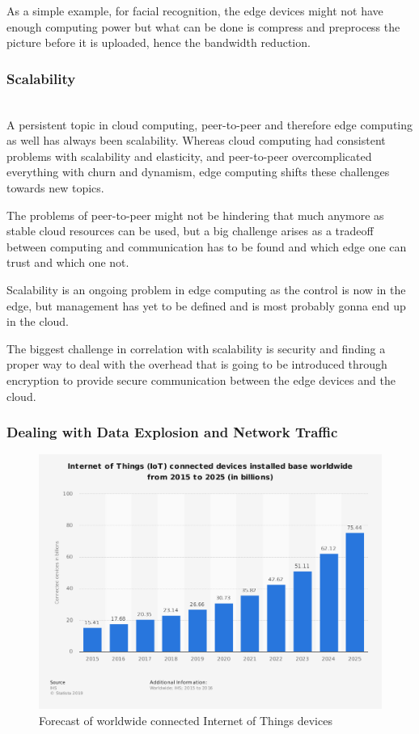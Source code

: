 As a simple example, for facial recognition, the edge devices might not have enough computing power but what can be done is compress and preprocess the picture before it is uploaded, hence the bandwidth reduction.

\subsubsection{Scalability}\hspace*{\fill} \\
A persistent topic in cloud computing, peer-to-peer and therefore edge computing as well has always been scalability.
Whereas cloud computing had consistent problems with scalability and elasticity, and peer-to-peer overcomplicated everything with churn and dynamism, edge computing shifts these challenges towards new topics.

The problems of peer-to-peer might not be hindering that much anymore as stable cloud resources can be used, but a big challenge arises as a tradeoff between computing and communication has to be found  and which edge one can trust and which one not.

Scalability is an ongoing problem in edge computing as the control is now in the edge, but management has yet to be defined and is most probably gonna end up in the cloud.

The biggest challenge in correlation with scalability is security and finding a proper way to deal with the overhead that is going to be introduced through encryption to provide secure communication between the edge devices and the cloud.

\subsubsection{Dealing with Data Explosion and Network Traffic}\hspace*{\fill} \begin{figure}[H]
    \centering
    \includegraphics[width=1\textwidth]{resources/images/global_iot_devices.png}
    \caption{Forecast of worldwide connected Internet of Things devices}
    \label{fig:global_iot_devices}
\end{figure}

